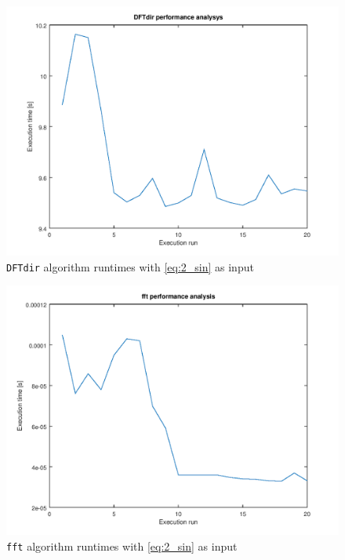 \documentclass[a4paper, 12pt]{report}
\begin{document}
			\begin{figure}[H]
				\centering
				\includegraphics[width=.8\textwidth]{img/2_3.png}
				\caption{\texttt{DFTdir} algorithm runtimes with \eqref{eq:2_sin} as input}
				\label{fig:2_dft_performance}
			\end{figure}

			\begin{figure}[H]
				\centering
				\includegraphics[width=.8\textwidth]{img/2_4.png}
				\caption{\texttt{fft} algorithm runtimes with \eqref{eq:2_sin} as input}
				\label{fig:2_fft_performance}
			\end{figure}
\end{document}
